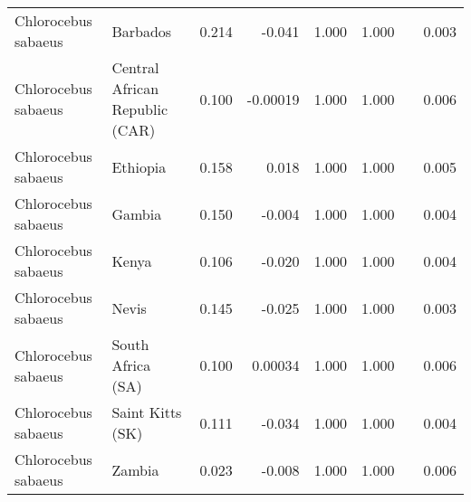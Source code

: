 \begin{center}
\begin{adjustbox}{width = 1\textwidth}
\begin{tabular}{|l|l|r|r|r|r|r|}
 Chlorocebus sabaeus &                        Barbados &                                              0.214 &                                             -0.041 &                1.000 &                                  1.000~~ &              0.003 \\
 Chlorocebus sabaeus &  Central African Republic (CAR) &                                              0.100 &                                           -0.00019 &                1.000 &                                  1.000~~ &              0.006 \\
 Chlorocebus sabaeus &                        Ethiopia &                                              0.158 &                                              0.018 &                1.000 &                                  1.000~~ &              0.005 \\
 Chlorocebus sabaeus &                          Gambia &                                              0.150 &                                             -0.004 &                1.000 &                                  1.000~~ &              0.004 \\
 Chlorocebus sabaeus &                           Kenya &                                              0.106 &                                             -0.020 &                1.000 &                                  1.000~~ &              0.004 \\
 Chlorocebus sabaeus &                           Nevis &                                              0.145 &                                             -0.025 &                1.000 &                                  1.000~~ &              0.003 \\
 Chlorocebus sabaeus &               South Africa (SA) &                                              0.100 &                                            0.00034 &                1.000 &                                  1.000~~ &              0.006 \\
 Chlorocebus sabaeus &                Saint Kitts (SK) &                                              0.111 &                                             -0.034 &                1.000 &                                  1.000~~ &              0.004 \\
 Chlorocebus sabaeus &                          Zambia &                                              0.023 &                                             -0.008 &                1.000 &                                  1.000~~ &              0.006 \\

\end{tabular}
\end{adjustbox}
\end{center}
